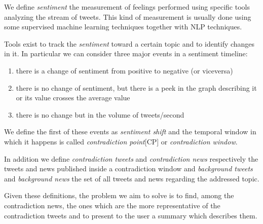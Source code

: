 We define \emph{sentiment} the measurement of feelings performed using specific
tools analyzing the stream of tweets. This kind of measurement is usually done
using some supervised machine learning techniques together with NLP techniques.

Tools exist to track the \emph{sentiment} toward a certain topic and to identify
changes in it. In particular we can consider three major events in a sentiment
timeline:
\begin{enumerate}
	\item there is a change of sentiment from positive to negative (or
		viceversa)
	\item there is no change of sentiment, but there is a peek in the graph
		describing it or its value crosses the average value
	\item there is no change but in the volume of tweets/second
\end{enumerate}
We define the first of these events as \emph{sentiment shift} and the temporal
window in which it happens is called \emph{contradiction point}[CP] or
\emph{contradiction window}.

In addition we define \emph{contradiction tweets} and \emph{contradiction news}
respectively the tweets and news published inside a contradiction window and
\emph{background tweets} and \emph{background news} the set of all tweets and
news regarding the addressed topic.

Given these definitions, the problem we aim to solve is to find, among the
contradiction news, the ones which are the more representative of the
contradiction tweets and to present to the user a summary which describes them.
